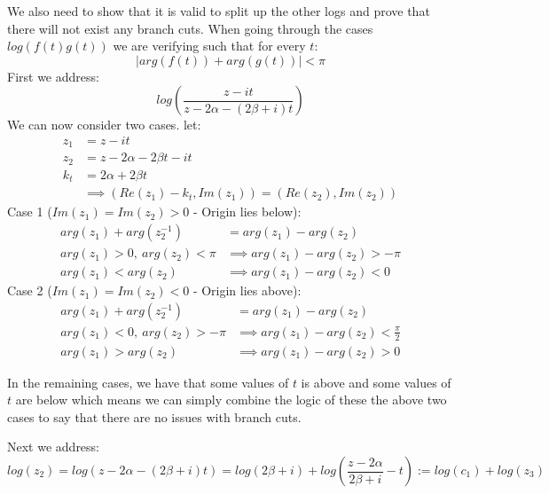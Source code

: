 \documentclass{article}
\begin{document}
We also need to show that it is valid to split up the other logs and prove that there will not exist any branch cuts.
When going through the cases $log(f(t)g(t))$ we are verifying such that for every $t$:
$$|arg(f(t))+arg(g(t))|<\pi$$
First we address:
$$log(\frac{z-it}{z-2\alpha-(2\beta+i)t})$$
We can now consider two cases.
let:
\begin{align}
    z_1&=z-it\\
    z_2&=z-2\alpha-2\beta t-it\\
    k_t&=2\alpha+2\beta t\\
    &\implies (Re(z_1)-k_t, Im(z_1))=(Re(z_2), Im(z_2))
\end{align}
Case 1 ($Im(z_1)=Im(z_2)>0$ - Origin lies below):
\begin{align}
    arg(z_1)+arg(z_2^{-1})&=arg(z_1)-arg(z_2)\\
    arg(z_1)>0,\:arg(z_2)<\pi&\implies arg(z_1)-arg(z_2)>-\pi\\
    arg(z_1)<arg(z_2)&\implies arg(z_1)-arg(z_2)<0
\end{align}
Case 2 ($Im(z_1)=Im(z_2)<0$ - Origin lies above):
\begin{align}
    arg(z_1)+arg(z_2^{-1})&=arg(z_1)-arg(z_2)\\
    arg(z_1)<0,\:arg(z_2)>-\pi&\implies arg(z_1)-arg(z_2)<\frac{\pi}{2}\\
    arg(z_1)>arg(z_2)&\implies arg(z_1)-arg(z_2)>0
\end{align}

In the remaining cases, we have that some values of $t$ is above and some values of $t$ are below which means we can simply combine the logic of these the above two cases to say that there are no issues with branch cuts.

Next we address:
$$log(z_2)=log(z-2\alpha-(2\beta+i)t)=log(2\beta+i)+log(\frac{z-2\alpha}{2\beta+i}-t):=log(c_1)+log(z_3)$$
\end{document}

